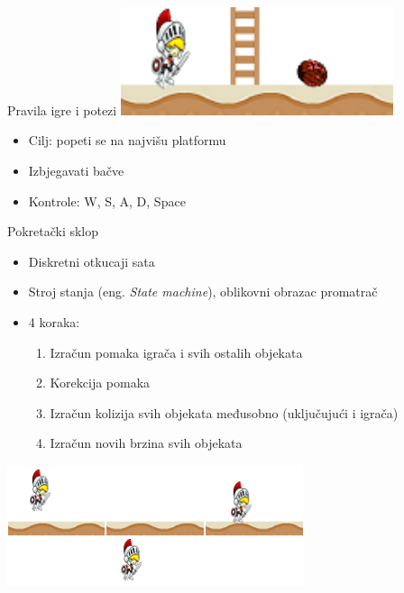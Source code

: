 	\begin{frame}{Pravila igre i potezi}
		\hspace{5em}\includegraphics[width=0.6\textwidth]{slike/game}
		\begin{itemize}
			\item Cilj: popeti se na najvišu platformu
			\item Izbjegavati bačve
			\item Kontrole: W, S, A, D, Space
		\end{itemize}
	\end{frame}

	\begin{frame}{Pokretački sklop }
	 	\begin{itemize}
	 		\item Diskretni otkucaji sata 
	 		\item Stroj stanja (eng. \textit{State machine}), oblikovni obrazac promatrač
	 		\item 4 koraka:
	 		\begin{enumerate}
	 			\item Izračun pomaka igrača i svih ostalih objekata
	 			\item Korekcija pomaka
	 			\item Izračun kolizija svih objekata međusobno (uključujući i igrača)
	 			\item Izračun novih brzina svih objekata 
	 		\end{enumerate}
	 	\end{itemize}
	 	\hspace{5em}\includegraphics[width=0.65\textwidth]{slike/positionCorrection}
	\end{frame}
	
